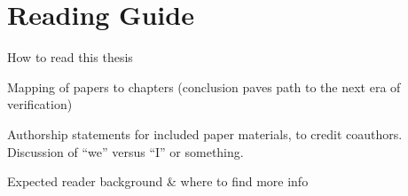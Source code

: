 \section{Reading Guide}


How to read this thesis

Mapping of papers to chapters (conclusion paves path to the next era of verification)

Authorship statements for included paper materials, to credit coauthors. Discussion of ``we'' versus ``I'' or something.

Expected reader background \& where to find more info
